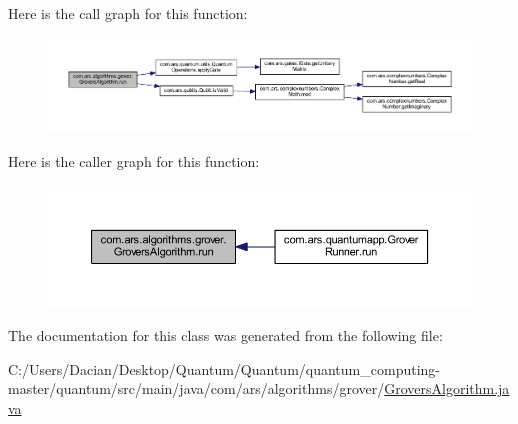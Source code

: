 Here is the call graph for this function\+:\nopagebreak
\begin{figure}[H]
\begin{center}
\leavevmode
\includegraphics[width=350pt]{classcom_1_1ars_1_1algorithms_1_1grover_1_1_grovers_algorithm_a4b7b6a2e63a64325769a5ebeffb90ea9_cgraph}
\end{center}
\end{figure}
Here is the caller graph for this function\+:\nopagebreak
\begin{figure}[H]
\begin{center}
\leavevmode
\includegraphics[width=350pt]{classcom_1_1ars_1_1algorithms_1_1grover_1_1_grovers_algorithm_a4b7b6a2e63a64325769a5ebeffb90ea9_icgraph}
\end{center}
\end{figure}


The documentation for this class was generated from the following file\+:\begin{DoxyCompactItemize}
\item 
C\+:/\+Users/\+Dacian/\+Desktop/\+Quantum/\+Quantum/quantum\+\_\+computing-\/master/quantum/src/main/java/com/ars/algorithms/grover/\hyperlink{_grovers_algorithm_8java}{Grovers\+Algorithm.\+java}\end{DoxyCompactItemize}
